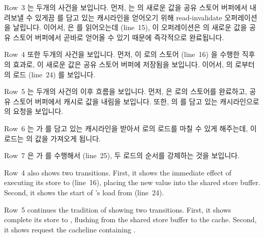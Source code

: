 Row~3 는 두개의 사건을 보입니다.
먼저,  는  의 새로운 값을 공유 스토어 버퍼에서 내려보낼 수
있게끔  를 담고 있는 캐시라인을 얻어오기 위해 read-invalidate
오퍼레이션을 날립니다.
이어서,  은  를 읽어오는데 (line~15), 이 오퍼레이션은  의
새로운 값을 공유 스토어 버퍼에서 곧바로 얻어올 수 있기 때문에 즉각적으로
완료됩니다.

Row~4 또한 두개의 사건을 보입니다.
먼저,  이  로의 스토어 (line~16) 을 수행한 직후의 효과로, 이
새로운 값은 공유 스토어 버퍼에 저장됨을 보입니다.
이어서,  의  로부터의 로드 (line~24) 를 보입니다.

Row~5 는 두개의 사건의 이후 흐름을 보입니다.
먼저,  은  로의 스토어를 완료하고, 공유 스토어 버퍼에서 캐시로
값을 내림을 보입니다.
또한,  의  를 담고 있는 캐시라인으로의 요청을 보입니다.

Row~6 는  가  를 담고 있는 캐시라인을 받아서  로의 로드를
마칠 수 있게 해주는데, 이 로드는  의 값을 가져오게 됩니다.

Row~7 은  가  를 수행해서 (line~25), 두 로드의 순서를
강제하는 것을 보입니다.
\iffalse

Row~4 also shows two transitions.
First, it shows the immediate effect of  executing its store to
 (line~16), placing the new value into the shared store buffer.
Second, it shows the start of 's load from  (line~24).

Row~5 continues the tradition of showing two transitions.
First, it shows  complete its store to , flushing
from the shared store buffer to the cache.
Second, it shows  request the cacheline containing .


